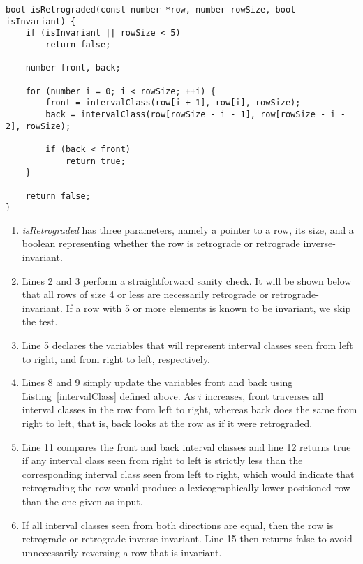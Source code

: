 \begin{lstlisting}[caption={Determining whether a representative of a row class is retrograded.},label={isRetrograded}]
bool isRetrograded(const number *row, number rowSize, bool isInvariant) {
    if (isInvariant || rowSize < 5)
        return false;

    number front, back;

    for (number i = 0; i < rowSize; ++i) {
        front = intervalClass(row[i + 1], row[i], rowSize);
        back = intervalClass(row[rowSize - i - 1], row[rowSize - i - 2], rowSize);

        if (back < front)
            return true;
    }

    return false;
}
\end{lstlisting}

\begin{enumerate}
\item \emph{isRetrograded} has three parameters, namely a pointer to a row, its size, and a boolean representing whether the row is retrograde or retrograde inverse-invariant.
\item Lines 2 and 3 perform a straightforward sanity check. It will be shown below that all rows of size 4 or less are necessarily retrograde or retrograde-invariant. If a row with 5 or more elements is known to be invariant, we skip the test.
\addtocounter{enumi}{2}
\item Line 5 declares the variables that will represent interval classes seen from left to right, and from right to left, respectively.
\addtocounter{enumi}{2}
\item Lines 8 and 9 simply update the variables front and back using Listing~\ref{intervalClass} defined above. As $i$ increases, front traverses all interval classes in the row from left to right, whereas back does the same from right to left, that is, back looks at the row as if it were retrograded.
\addtocounter{enumi}{2}
\item Line 11 compares the front and back interval classes and line 12 returns true if any interval class seen from right to left is strictly less than the corresponding interval class seen from left to right, which would indicate that retrograding the row would produce a lexicographically lower-positioned row than the one given as input.
\addtocounter{enumi}{3}
\item If all interval classes seen from both directions are equal, then the row is retrograde or retrograde inverse-invariant. Line 15 then returns false to avoid unnecessarily reversing a row that is invariant.
\end{enumerate}

